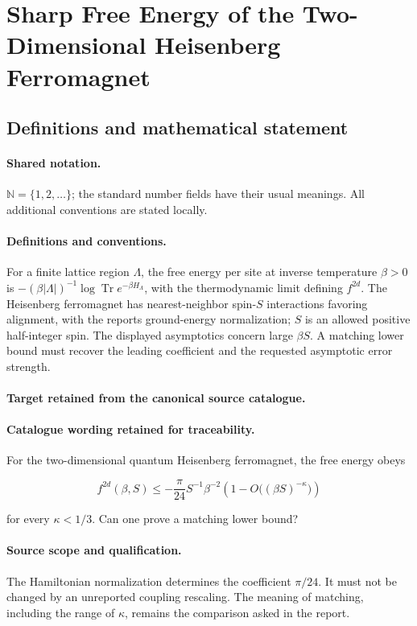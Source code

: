 \documentclass[11pt]{article}
\begin{document}
\section{Sharp Free Energy of the Two-Dimensional Heisenberg Ferromagnet}\label{statement}

\subsection{Definitions and mathematical statement}

\paragraph{Shared notation.}$\mathbb N=\{1,2,\ldots\}$; the standard number fields have their usual meanings. All additional conventions are stated locally.


\paragraph{Definitions and conventions.}
For a finite lattice region $\Lambda$, the free energy per site at inverse temperature $\beta>0$ is $-(\beta|\Lambda|)^{-1}\log\operatorname{Tr}e^{-\beta H_\Lambda}$, with the thermodynamic limit defining $f^{2d}$. The Heisenberg ferromagnet has nearest-neighbor spin-$S$ interactions favoring alignment, with the report\textquotesingle s ground-energy normalization; $S$ is an allowed positive half-integer spin. The displayed asymptotics concern large $\beta S$. A matching lower bound must recover the leading coefficient and the requested asymptotic error strength.

\paragraph{Target retained from the canonical source catalogue.}
\paragraph{Catalogue wording retained for traceability.}
For the two-dimensional quantum Heisenberg ferromagnet, the free energy obeys

$$f^{2d}(\beta,S)\leq-\frac\pi{24}S^{-1}\beta^{-2}\left(1-O\bigl((\beta S)^{-\kappa}\bigr)\right)$$

for every $\kappa<1/3$. Can one prove a matching lower bound?

\paragraph{Source scope and qualification.}
The Hamiltonian normalization determines the coefficient $\pi/24$. It must not be changed by an unreported coupling rescaling. The meaning of matching, including the range of $\kappa$, remains the comparison asked in the report.
\end{document}
